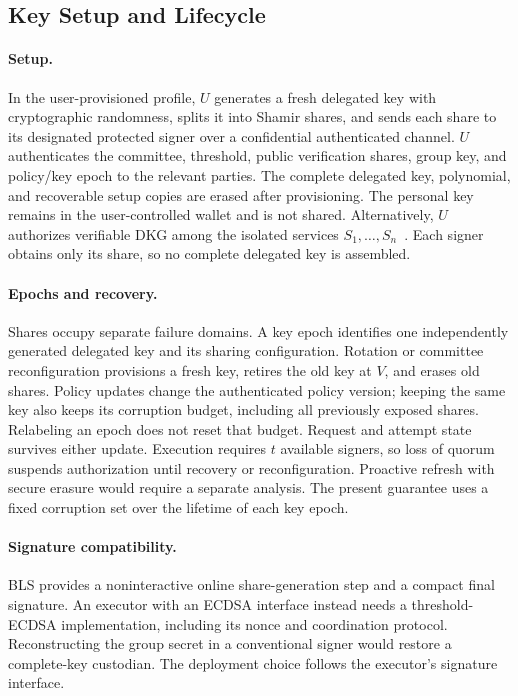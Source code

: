 \documentclass{article}
\begin{document}
\subsection{Key Setup and Lifecycle}

\paragraph{Setup.}
In the user-provisioned profile, $U$ generates a fresh delegated key with
cryptographic randomness, splits it into Shamir shares, and sends each share
to its designated protected signer over a confidential authenticated channel.
$U$ authenticates the committee, threshold, public verification shares, group
key, and policy/key epoch to the relevant parties. The complete delegated key,
polynomial, and recoverable setup copies are erased after provisioning.
The personal key remains in the user-controlled wallet and is not shared.
Alternatively, $U$ authorizes verifiable DKG among the isolated services
$S_1,\ldots,S_n$~\citep{gennaro2007dkg}. Each signer obtains only its share, so no complete delegated
key is assembled. 
\paragraph{Epochs and recovery.}
Shares occupy separate failure domains. A key epoch identifies one independently
generated delegated key and its sharing configuration. Rotation or committee
reconfiguration provisions a fresh key, retires the old key at $V$, and erases
old shares. Policy updates change the authenticated policy version; keeping
the same key also keeps its corruption budget, including all previously
exposed shares. Relabeling an epoch does not reset that budget. Request and
attempt state survives either update.
Execution requires $t$ available signers, so loss of quorum suspends
authorization until recovery or reconfiguration. Proactive refresh with secure
erasure would require a separate analysis. The present guarantee uses a fixed
corruption set over the lifetime of each key epoch.

\paragraph{Signature compatibility.}
BLS provides a noninteractive online share-generation step and a compact final
signature. An executor with an ECDSA interface instead needs a threshold-ECDSA
implementation, including its nonce and coordination protocol. Reconstructing
the group secret in a conventional signer would restore a complete-key
custodian. The deployment choice follows the executor's signature interface.
\end{document}
